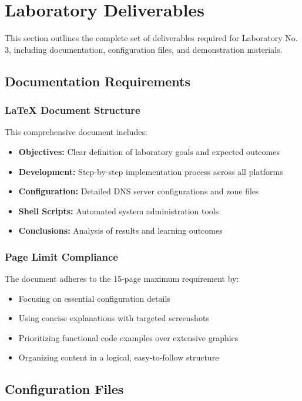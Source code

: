 \documentclass[12pt,a4paper]{article}
\begin{document}
\section{Laboratory Deliverables}\label{sec:deliverables}

This section outlines the complete set of deliverables required for Laboratory No. 3, including documentation, configuration files, and demonstration materials.

\subsection{Documentation Requirements}\label{subsec:documentation}

\subsubsection{LaTeX Document Structure}
This comprehensive document includes:
\begin{itemize}
    \item \textbf{Objectives:} Clear definition of laboratory goals and expected outcomes
    \item \textbf{Development:} Step-by-step implementation process across all platforms
    \item \textbf{Configuration:} Detailed DNS server configurations and zone files
    \item \textbf{Shell Scripts:} Automated system administration tools
    \item \textbf{Conclusions:} Analysis of results and learning outcomes
\end{itemize}

\subsubsection{Page Limit Compliance}
The document adheres to the 15-page maximum requirement by:
\begin{itemize}
    \item Focusing on essential configuration details
    \item Using concise explanations with targeted screenshots
    \item Prioritizing functional code examples over extensive graphics
    \item Organizing content in a logical, easy-to-follow structure
\end{itemize}

\subsection{Configuration Files}\label{subsec:config-files}
\end{document}
